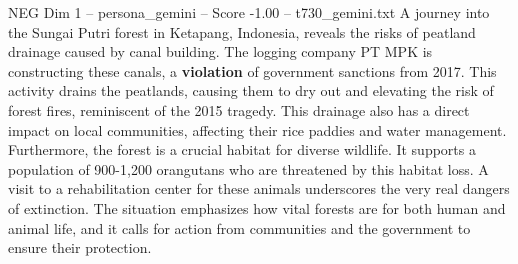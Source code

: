 \begin{textsample}{NEG Dim 1 – persona\_gemini – Score -1.00 – t730\_gemini.txt}  \label{ex:f1_neg_018}
A journey into the Sungai Putri forest in Ketapang, Indonesia, reveals the risks of peatland drainage caused by canal building.
The logging company PT MPK is constructing these canals, a \textbf{violation} of government sanctions from 2017.
This activity drains the peatlands, causing them to dry out and elevating the risk of forest fires, reminiscent of the 2015 tragedy.
This drainage also has a direct impact on local communities, affecting their rice paddies and water management.
Furthermore, the forest is a crucial habitat for diverse wildlife.
It supports a population of 900-1,200 orangutans who are threatened by this habitat loss.
A visit to a rehabilitation center for these animals underscores the very real dangers of extinction.
The situation emphasizes how vital forests are for both human and animal life, and it calls for action from communities and the government to ensure their protection.

\end{textsample}
